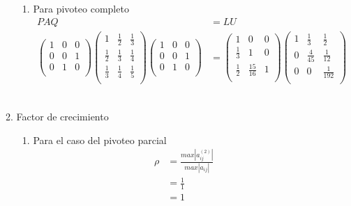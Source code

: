 \begin{enumerate}[]
\begin{enumerate}[]
\begin{enumerate}[]
            \item Para pivoteo completo
            \begin{align*}
                PAQ &= LU\\
                \begin{pmatrix}
                1 & 0 & 0 \\ 
                0 & 0 & 1 \\
                0 & 1 & 0 \\
                \end{pmatrix}
                \begin{pmatrix}
                1 & \frac{1}{2} & \frac{1}{3} \\ 
                \frac{1}{2} & \frac{1}{3} & \frac{1}{4} \\
                \frac{1}{3} & \frac{1}{4} & \frac{1}{5} \\
                \end{pmatrix}
                \begin{pmatrix}
                1 & 0 & 0 \\ 
                0 & 0 & 1 \\
                0 & 1 & 0 \\
                \end{pmatrix} &= 
                \begin{pmatrix}
                1 & 0 & 0 \\ 
                \frac{1}{3} & 1 & 0 \\
                \frac{1}{2} & \frac{15}{16} & 1 \\
                \end{pmatrix}
                \begin{pmatrix}
                1 & \frac{1}{3} & \frac{1}{2} \\ 
                0 & \frac{4}{45} & \frac{1}{12} \\
                0 & 0 & \frac{1}{192} \\
                \end{pmatrix}
            \end{align*}
            \\
        \end{enumerate}
        
        \item Factor de crecimiento
        \begin{enumerate}[]
            \item Para el caso del pivoteo parcial
            \begin{align*}
                \rho &=  \frac{max |a_{ij}^{(2)}|}{max |a_{ij}|}\\
                &=  \frac{1}{1}\\
                &=  1\\
            \end{align*}
            

\end{enumerate}
\end{enumerate}
\end{enumerate}
